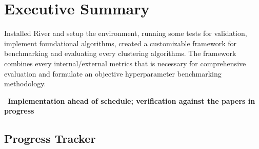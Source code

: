 \section{Executive Summary}
\begin{description}[font=\bfseries\color{accentdark},style=sameline,leftmargin=0pt,labelindent=0pt,itemindent=0pt,labelwidth=0pt,labelsep=0.4em,
                    itemsep=4pt,topsep=2pt]
  \item[Objective -] Installed River and setup the environment, running some tests for validation, implement foundational algorithms, created a customizable framework for benchmarking and evaluating every clustering algorithms. The framework combines every internal/external metrics that is necessary for comprehensive evaluation and formulate an objective hyperparameter benchmarking methodology.
  \item[Status -] \WIP\ \textbf{Implementation ahead of schedule; verification against the papers in progress}
\end{description}

\subsection*{Progress Tracker}

